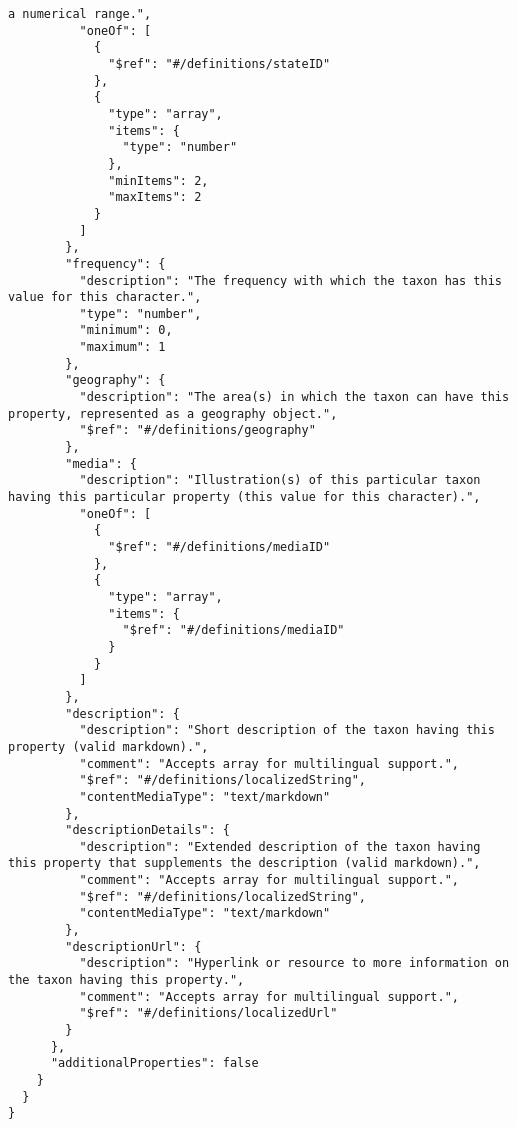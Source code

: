 \documentclass[10pt,letterpaper]{article}
\begin{document}
\begin{verbatim}
a numerical range.",
          "oneOf": [
            {
              "$ref": "#/definitions/stateID"
            },
            {
              "type": "array",
              "items": {
                "type": "number"
              },
              "minItems": 2,
              "maxItems": 2
            }
          ]
        },
        "frequency": {
          "description": "The frequency with which the taxon has this
value for this character.",
          "type": "number",
          "minimum": 0,
          "maximum": 1
        },
        "geography": {
          "description": "The area(s) in which the taxon can have this
property, represented as a geography object.",
          "$ref": "#/definitions/geography"
        },
        "media": {
          "description": "Illustration(s) of this particular taxon
having this particular property (this value for this character).",
          "oneOf": [
            {
              "$ref": "#/definitions/mediaID"
            },
            {
              "type": "array",
              "items": {
                "$ref": "#/definitions/mediaID"
              }
            }
          ]
        },
        "description": {
          "description": "Short description of the taxon having this
property (valid markdown).",
          "comment": "Accepts array for multilingual support.",
          "$ref": "#/definitions/localizedString",
          "contentMediaType": "text/markdown"
        },
        "descriptionDetails": {
          "description": "Extended description of the taxon having
this property that supplements the description (valid markdown).",
          "comment": "Accepts array for multilingual support.",
          "$ref": "#/definitions/localizedString",
          "contentMediaType": "text/markdown"
        },
        "descriptionUrl": {
          "description": "Hyperlink or resource to more information on
the taxon having this property.",
          "comment": "Accepts array for multilingual support.",
          "$ref": "#/definitions/localizedUrl"
        }
      },
      "additionalProperties": false
    }
  }
}
\end{verbatim}
\nolinenumbers
\end{document}
